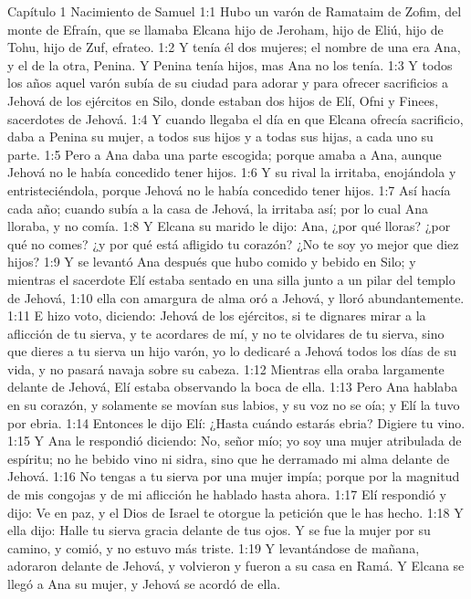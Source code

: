 Capítulo 1 
Nacimiento de Samuel  
1:1 Hubo un varón de Ramataim de Zofim, del monte de Efraín, que se llamaba Elcana hijo de Jeroham, hijo de Eliú, hijo de Tohu, hijo de Zuf, efrateo.  
1:2 Y tenía él dos mujeres; el nombre de una era Ana, y el de la otra, Penina. Y Penina tenía hijos, mas Ana no los tenía.  
1:3 Y todos los años aquel varón subía de su ciudad para adorar y para ofrecer sacrificios a Jehová de los ejércitos en Silo, donde estaban dos hijos de Elí, Ofni y Finees, sacerdotes de Jehová.  
1:4 Y cuando llegaba el día en que Elcana ofrecía sacrificio, daba a Penina su mujer, a todos sus hijos y a todas sus hijas, a cada uno su parte.  
1:5 Pero a Ana daba una parte escogida; porque amaba a Ana, aunque Jehová no le había concedido tener hijos.  
1:6 Y su rival la irritaba, enojándola y entristeciéndola, porque Jehová no le había concedido tener hijos.  
1:7 Así hacía cada año; cuando subía a la casa de Jehová, la irritaba así; por lo cual Ana lloraba, y no comía.  
1:8 Y Elcana su marido le dijo: Ana, ¿por qué lloras? ¿por qué no comes? ¿y por qué está afligido tu corazón? ¿No te soy yo mejor que diez hijos?  
1:9 Y se levantó Ana después que hubo comido y bebido en Silo; y mientras el sacerdote Elí estaba sentado en una silla junto a un pilar del templo de Jehová,  
1:10 ella con amargura de alma oró a Jehová, y lloró abundantemente.  
1:11 E hizo voto, diciendo: Jehová de los ejércitos, si te dignares mirar a la aflicción de tu sierva, y te acordares de mí, y no te olvidares de tu sierva, sino que dieres a tu sierva un hijo varón, yo lo dedicaré a Jehová todos los días de su vida, y no pasará navaja sobre su cabeza. 
1:12 Mientras ella oraba largamente delante de Jehová, Elí estaba observando la boca de ella.  
1:13 Pero Ana hablaba en su corazón, y solamente se movían sus labios, y su voz no se oía; y Elí la tuvo por ebria.  
1:14 Entonces le dijo Elí: ¿Hasta cuándo estarás ebria? Digiere tu vino.  
1:15 Y Ana le respondió diciendo: No, señor mío; yo soy una mujer atribulada de espíritu; no he bebido vino ni sidra, sino que he derramado mi alma delante de Jehová.  
1:16 No tengas a tu sierva por una mujer impía; porque por la magnitud de mis congojas y de mi aflicción he hablado hasta ahora.  
1:17 Elí respondió y dijo: Ve en paz, y el Dios de Israel te otorgue la petición que le has hecho.  
1:18 Y ella dijo: Halle tu sierva gracia delante de tus ojos. Y se fue la mujer por su camino, y comió, y no estuvo más triste.  
1:19 Y levantándose de mañana, adoraron delante de Jehová, y volvieron y fueron a su casa en Ramá. Y Elcana se llegó a Ana su mujer, y Jehová se acordó de ella.  
